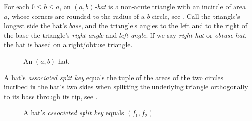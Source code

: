 \documentclass[%
    a4paper,              %
    style=screen,          %
    bibliography=totoc,   %
    nexus,                %
    lnum,                 %
    extramargin,          %
]{tubsbook}
\newcommand\defaulta{30}
\newcommand\defaultb{40}
\newcommand\defaultr{0.2}
\begin{document}
\begin{definition}
    For each $0 \le b \le a$, an \emph{$(a,b)$-hat} is a non-acute triangle with an incircle of area $a$, whose corners are rounded to the radius of a $b$-circle, see . Call the triangle's longest side the hat's \emph{base}, and the triangle's angles to the left and to the right of the base the triangle's \emph{right-angle} and \emph{left-angle}.
    If we say \emph{right hat} or \emph{obtuse hat}, the hat is based on a right/obtuse triangle.
\end{definition}

\begin{figure}[htbp!]
    \centering


    \caption{An $(a,b)$-hat.}
    \label{fig:hat}
\end{figure}

\begin{definition}\label{def:hat-split-key}
    A hat's \emph{associated split key} equals the tuple of the areas of the two circles incribed in the hat's two sides when splitting the underlying triangle orthogonally to its base through its tip, see .
\end{definition}

\begin{figure}[htbp!]
    \centering


    \caption{A hat's \emph{associated split key} equals $(f_1, f_2)$}
    \label{fig:hatf}
\end{figure}
\end{document}
